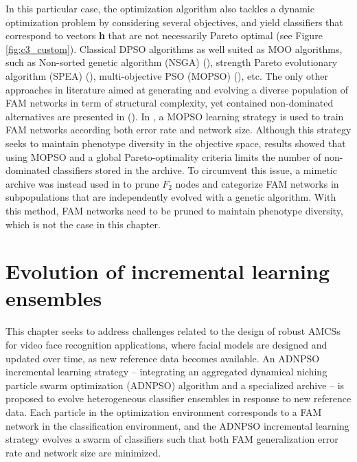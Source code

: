 In this particular case, the optimization algorithm also tackles a dynamic optimization problem by considering several objectives, and yield classifiers that correspond to vectors \textbf{h} that are not necessarily Pareto optimal (see Figure \ref{fig:c3_custom}).
Classical DPSO algorithms as well suited as MOO algorithms, such as Non-sorted genetic algorithm (NSGA) (\cite{deb02}), strength Pareto evolutionary algorithm (SPEA) (\cite{zitzler99}), multi-objective PSO (MOPSO) (\cite{coello04}), etc.
The only other approaches in literature aimed at generating and evolving a diverse population of FAM networks in term of structural complexity, yet contained non-dominated alternatives are presented in (\cite{granger10, li10}).
In \cite{granger10}, a MOPSO learning strategy is used to train FAM networks according both error rate and network size.
Although this strategy seeks to maintain phenotype diversity in the objective space, results showed that using MOPSO and a global Pareto-optimality criteria limits the number of non-dominated classifiers stored in the archive.
To circumvent this issue, a mimetic archive was instead used in \cite{li10} to prune $F_2$ nodes and categorize FAM networks in subpopulations that are independently evolved with a genetic algorithm.
With this method, FAM networks need to be pruned to maintain phenotype diversity, which is not the case in this chapter.


\section{Evolution of incremental learning ensembles}
\label{sec:c3_algo}

This chapter seeks to address challenges related to the design of robust AMCSs for video face recognition applications, where facial models are designed and updated over time, as new reference data becomes available.
An ADNPSO incremental learning strategy -- integrating an aggregated dynamical niching particle swarm optimization (ADNPSO) algorithm and a specialized archive -- is proposed to evolve heterogeneous classifier ensembles in response to new reference data.
Each particle in the optimization environment corresponds to a FAM network in the classification environment, and the ADNPSO incremental learning strategy evolves a swarm of classifiers such that both FAM generalization error rate and network size are minimized.

